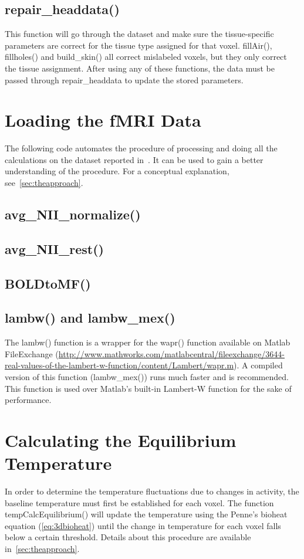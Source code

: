 \subsection{repair\_headdata()}
This function will go through the dataset and make sure the tissue-specific parameters are correct for the tissue type assigned for that voxel.  fillAir(), fillholes() and build\_skin() all correct mislabeled voxels, but they only correct the tissue assignment.  After using any of these functions, the data must be passed through repair\_headdata to update the stored parameters.

\clearpage
\section{Loading the fMRI Data}
The following code automates the procedure of processing and doing all the calculations on the dataset reported in~\citet{dhamala}.  It can be used to gain a better understanding of the procedure. For a conceptual explanation, see~\cref{sec:theapproach}.

\subsection{avg\_NII\_normalize()}

\subsection{avg\_NII\_rest()}

\subsection{BOLDtoMF()}

\subsection{lambw() and lambw\_mex()}
The lambw() function is a wrapper for the wapr() function available on Matlab FileExchange (\url{http://www.mathworks.com/matlabcentral/fileexchange/3644-real-values-of-the-lambert-w-function/content/Lambert/wapr.m}).  A compiled version of this function (lambw\_mex()) runs much faster and is recommended.  This function is used over Matlab's built-in Lambert-W function for the sake of performance.

\clearpage
\section{Calculating the Equilibrium Temperature}
In order to determine the temperature fluctuations due to changes in activity, the baseline temperature must first be established for each voxel.  The function tempCalcEquilibrium() will update the temperature using the Penne's bioheat equation (\cref{eq:3dbioheat}) until the change in temperature for each voxel falls below a certain threshold.  Details about this procedure are available in~\cref{sec:theapproach}.

\clearpage
